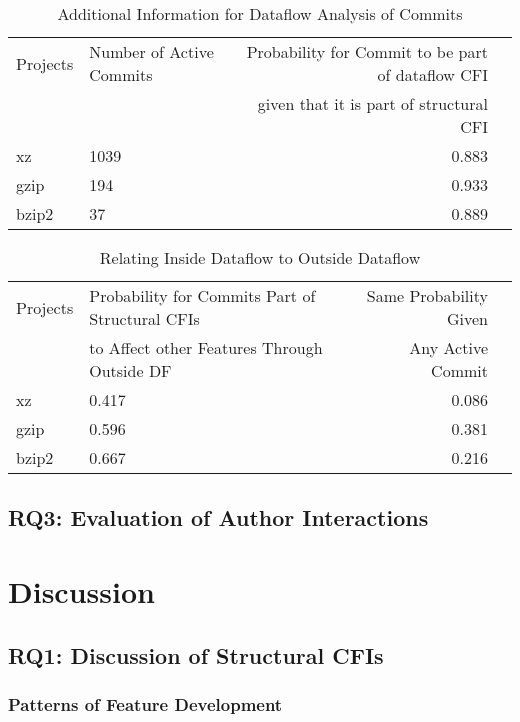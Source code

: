 \begin{table}[t]
\caption{Additional Information for Dataflow Analysis of Commits}
\label{tab:commit_dfbr_table}
\begin{tabular}{llrr}
 Projects & Number of Active Commits & Probability for Commit to be part of dataflow CFI \\
 	  & 			     & given that it is part of structural CFI \\
xz & 1039 & 0.883 \\
gzip & 194 & 0.933 \\
bzip2 & 37 & 0.889 \\
\end{tabular}
\end{table}

\begin{table}[t]
\caption{Relating Inside Dataflow to Outside Dataflow}
\label{tab:commit_dfbr_rel_table}
\begin{tabular}{llrr}
 Projects & Probability for Commits Part of Structural CFIs & Same Probability Given 	\\
 	  & to Affect other Features Through Outside DF     & Any Active Commit		\\
xz & 0.417 & 0.086 \\
gzip & 0.596 & 0.381 \\
bzip2 & 0.667 & 0.216 \\
\end{tabular}
\end{table}

\subsection*{\textbf{RQ3: Evaluation of Author Interactions}}\label{sec:eval_author_interactions}

\clearpage 

\section{Discussion}\label{sec:discussion}

\subsection*{\textbf{RQ1: Discussion of Structural CFIs}}\label{sec:eval_struc_cfis}

\subsubsection*{Patterns of Feature Development}\label{sec:eval_feature_development}

